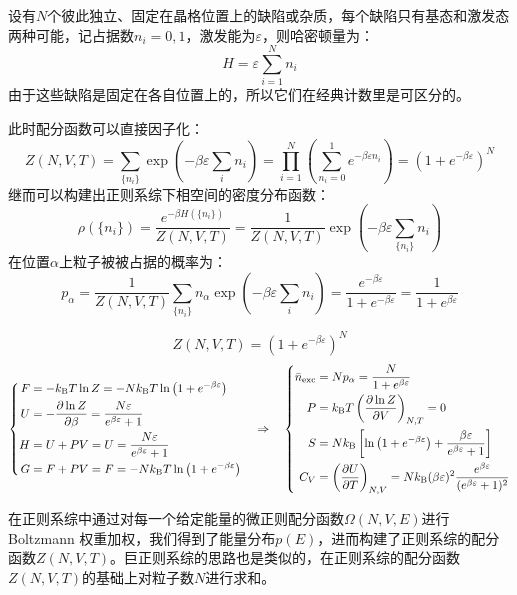 \begin{proposition}[正则系综下的两态系统]
设有$N$个彼此独立、固定在晶格位置上的缺陷或杂质，每个缺陷只有基态和激发态两种可能，记占据数$n_i=0,1$，激发能为$\varepsilon$，则哈密顿量为：
\[H=\varepsilon\sum_{i=1}^{N}n_i\]
由于这些缺陷是固定在各自位置上的，所以它们在经典计数里是可区分的。
\end{proposition}
此时配分函数可以直接因子化：
\[Z(N,V,T)=\sum_{\{n_i\}}\exp\left(-\beta\varepsilon\sum_i n_i\right)=\prod_{i=1}^{N}\left(\sum_{n_i=0}^{1}e^{-\beta\varepsilon n_i}\right)=\left(1+e^{-\beta\varepsilon}\right)^N\]
继而可以构建出正则系综下相空间的密度分布函数：
\[\rho(\{n_i\})=\frac{e^{-\beta H(\{n_i\})}}{Z(N,V,T)}=\frac{1}{Z(N,V,T)}\exp\left(-\beta\varepsilon\sum_{\{n_i\}} n_i\right)\]
在位置$\alpha$上粒子被被占据的概率为：
\[p_\alpha=\frac{1}{Z(N,V,T)}\sum_{\{n_i\}}n_\alpha\exp\left(-\beta\varepsilon\sum_i n_i\right)=\frac{e^{-\beta\varepsilon}}{1+e^{-\beta\varepsilon}}=\frac{1}{1+e^{\beta\varepsilon}}\]
\begin{theorem}[正则系综下两态系统的热力学函数]
\[Z(N,V,T)=\left(1+e^{-\beta\varepsilon}\right)^N\]
\[\left\{\begin{aligned}
F&=-k_{\rm B}T\ln Z=-Nk_{\rm B} T\ln\left(1+e^{-\beta\varepsilon}\right)\\
U&=-\pdv{\ln Z}{\beta}=\frac{N\varepsilon}{e^{\beta\varepsilon}+1}\\
H&=U+PV=U=\frac{N\varepsilon}{e^{\beta\varepsilon}+1}\\
G&=F+PV=F=-Nk_{\rm B} T\ln\left(1+e^{-\beta\varepsilon}\right)
\end{aligned}\right.
\quad \Rightarrow \quad
\left\{\begin{aligned}
\bar n_{\rm exc}&=Np_{\alpha}=\frac{N}{1+e^{\beta\varepsilon}}\\
P&=k_{\rm B} T\left(\pdv{\ln Z}{V}\right)_{N,T}=0\\
S&=Nk_{\rm B}\left[\ln\left(1+e^{-\beta\varepsilon}\right)+\frac{\beta\varepsilon}{e^{\beta\varepsilon}+1}\right]\\
C_V&=\left(\pdv{U}{T}\right)_{N,V}=Nk_{\rm B}(\beta\varepsilon)^2\frac{e^{\beta\varepsilon}}{(e^{\beta\varepsilon}+1)^2}
\end{aligned}\right.\]
\end{theorem}

在正则系综中通过对每一个给定能量的微正则配分函数$\Omega(N,V,E)$进行 Boltzmann 权重加权，我们得到了能量分布$p(E)$，进而构建了正则系综的配分函数$Z(N,V,T)$。巨正则系综的思路也是类似的，在正则系综的配分函数$Z(N,V,T)$的基础上对粒子数$N$进行求和。

